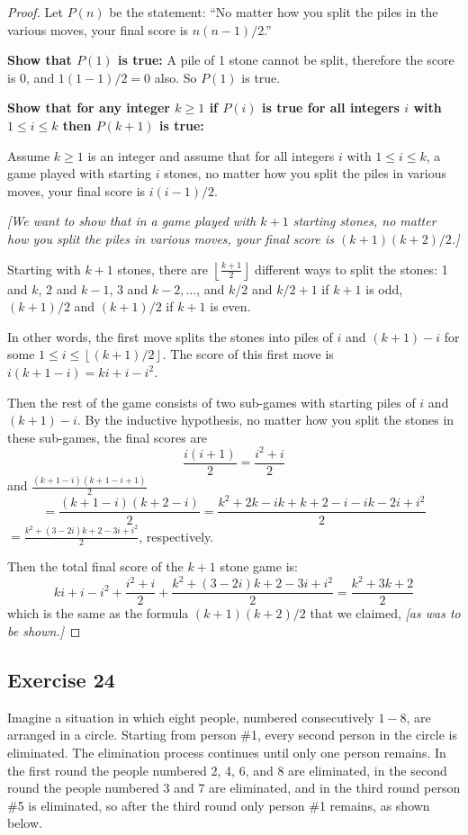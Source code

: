 \documentclass[14pt]{extarticle}
\newcommand{\dps}{\displaystyle}
\newcommand{\floor}[1]{{\left\lfloor#1\right\rfloor}}
\begin{document}
\begin{proof}
    Let $P(n)$ be the statement: ``No matter how you split the piles in the various moves, your final score is $n(n-1)/2$.''

    {\bf Show that $P(1)$ is true:} A pile of 1 stone cannot be split, therefore the score is 0, and $1(1-1)/2 = 0$ also. So $P(1)$ is true.

        {\bf Show that for any integer $k \geq 1$ if $P(i)$ is true for all integers $i$ with $1 \leq i \leq k$ then $P(k+1)$ is true:}

    Assume $k \geq 1$ is an integer and assume that for all integers $i$ with $1 \leq i \leq k$, a game played with
    starting $i$ stones, no matter how you split the piles in various moves, your final score is $i(i-1)/2$.

        {\it [We want to show that in a game played with $k+1$ starting stones, no matter how you split the piles in
                various moves, your final score is $(k+1)(k+2)/2$.]}

    Starting with $k+1$ stones, there are $\dps \floor{\frac{k + 1}{2}}$ different ways to split the stones: 1 and $k$,
    2 and $k-1$, 3 and $k-2, \ldots$, and $k/2$ and $k/2 + 1$ if $k+1$ is odd, $(k+1) / 2$ and $(k+1) / 2$ if $k+1$ is even.

    In other words, the first move splits the stones into piles of $i$ and $(k+1) - i$ for some $1 \leq i \leq \floor{(k + 1) / 2}$.
    The score of this first move is $i(k+1-i) = ki + i - i^2$.

    Then the rest of the game consists of two sub-games with starting piles of $i$ and $(k+1)-i$. By the inductive
    hypothesis, no matter how you split the stones in these sub-games, the final scores are
    \[
        \frac{i(i+1)}{2} = \frac{i^2 + i}{2}
    \]
    and $\dps \frac{(k+1-i)(k+1-i+1)}{2}$
    \[
        = \frac{(k+1-i)(k+2-i)}{2} = \frac{k^2 + 2k - ik + k + 2 - i - ik - 2i + i^2}{2}
    \]
    $\dps = \frac{k^2 + (3 - 2i)k + 2 - 3i + i^2}{2}$, respectively.

    Then the total final score of the $k+1$ stone game is:
    \[
        ki + i - i^2 + \frac{i^2 + i}{2} + \frac{k^2 + (3 - 2i)k + 2 - 3i + i^2}{2} = \frac{k^2 + 3k + 2}{2}
    \]
    which is the same as the formula $(k+1)(k+2)/2$ that we claimed, {\it [as was to be shown.]}
\end{proof}

\subsection{Exercise 24}
Imagine a situation in which eight people, numbered consecutively $1-8$, are arranged in a circle. Starting from person \#1, every second person in the circle is eliminated. The elimination process continues until only one person remains. In the first round the people numbered 2, 4, 6, and 8 are eliminated, in the second round the people numbered 3 and 7 are eliminated, and in the third round person \#5 is eliminated, so after the third round only person \#1 remains, as shown below.
\end{document}
